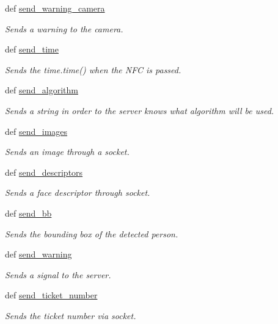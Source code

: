 \begin{DoxyCompactItemize}
\item 
def \hyperlink{namespacesend__socket_aeb5689be298a7688183cc64033a0e133}{send\-\_\-warning\-\_\-camera}
\begin{DoxyCompactList}\small\item\em Sends a warning to the camera. \end{DoxyCompactList}\item 
def \hyperlink{namespacesend__socket_a175b07f4e5553a550e407449ee4d515c}{send\-\_\-time}
\begin{DoxyCompactList}\small\item\em Sends the time.\-time() when the N\-F\-C is passed. \end{DoxyCompactList}\item 
def \hyperlink{namespacesend__socket_aae1cb172e6c1ed0b8ba07ffca84110db}{send\-\_\-algorithm}
\begin{DoxyCompactList}\small\item\em Sends a string in order to the server knows what algorithm will be used. \end{DoxyCompactList}\item 
def \hyperlink{namespacesend__socket_a87bac1ceef1a42db7f75298553bb4cff}{send\-\_\-images}
\begin{DoxyCompactList}\small\item\em Sends an image through a socket. \end{DoxyCompactList}\item 
def \hyperlink{namespacesend__socket_a3f6ef0d43b1f18943f50cd7f30f40c10}{send\-\_\-descriptors}
\begin{DoxyCompactList}\small\item\em Sends a face descriptor through socket. \end{DoxyCompactList}\item 
def \hyperlink{namespacesend__socket_a6ba5d738937fec9db7a5aaa1582f6e4b}{send\-\_\-bb}
\begin{DoxyCompactList}\small\item\em Sends the bounding box of the detected person. \end{DoxyCompactList}\item 
\hypertarget{namespacesend__socket_a6e3f996be0a8189c8b9a71cfd43e2edc}{def \hyperlink{namespacesend__socket_a6e3f996be0a8189c8b9a71cfd43e2edc}{send\-\_\-warning}}\label{namespacesend__socket_a6e3f996be0a8189c8b9a71cfd43e2edc}

\begin{DoxyCompactList}\small\item\em Sends a signal to the server. \end{DoxyCompactList}\item 
def \hyperlink{namespacesend__socket_a0ee66d89b9cb202b46365cd8f7ff1cd8}{send\-\_\-ticket\-\_\-number}
\begin{DoxyCompactList}\small\item\em Sends the ticket number via socket. \end{DoxyCompactList}\end{DoxyCompactItemize}
